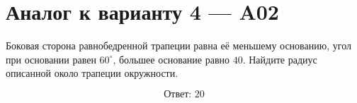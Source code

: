 \documentclass[12pt,a4paper]{article}
\begin{document}
\section*{Аналог к варианту 4 — A02}
Боковая сторона равнобедренной трапеции равна её меньшему основанию, угол при основании равен \(60^\circ\), большее основание равно \(40\). Найдите радиус описанной около трапеции окружности.
\begin{center}\figIsoscelesTrapezoidCircle\end{center}
\[\boxed{\text{Ответ: }20}\]
\end{document}
